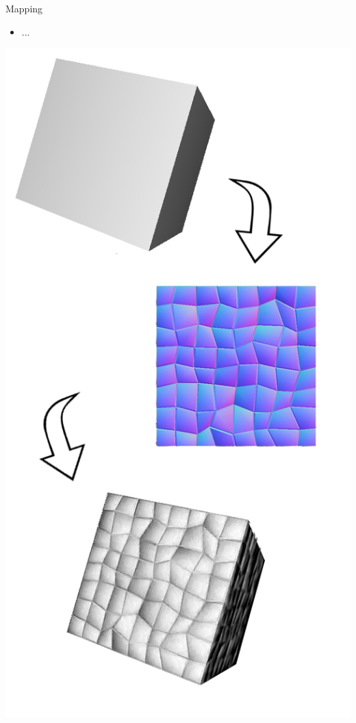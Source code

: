 \documentclass{lug}
\newcommand{\splitslide}[4]{
    \noindent
    \begin{minipage}{#1 \textwidth - #2 }
        #3
    \end{minipage}%
    \hspace{ \dimexpr #2 * 2 \relax }%
    \begin{minipage}{\textwidth - #1 \textwidth - #2 }
        #4
    \end{minipage}
}
\begin{document}
\begin{frame}{Mapping}
    \splitslide{0.65}{.7em}{
        \small
        \begin{itemize}
            \item ...
        \end{itemize}
    }{
        \includegraphics[width=\textwidth]{graphics/normal_map}
    }
\end{frame}
\end{document}

